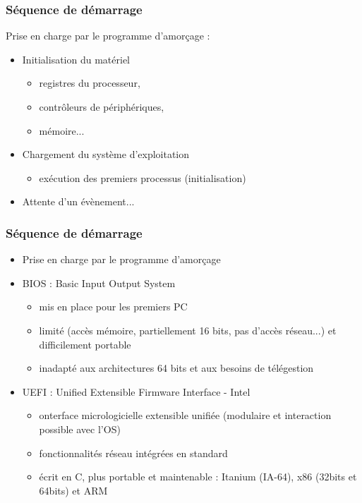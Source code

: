 \begin{frame}
\frametitle{Séquence de démarrage}
Prise en charge par le programme d’amorçage :
\begin{itemize}
\item Initialisation du matériel
\begin{itemize}
\item registres du processeur,
\item contrôleurs de périphériques,
\item mémoire...
\end{itemize}
\item Chargement du système d’exploitation
\begin{itemize}
\item exécution des premiers processus (initialisation)
\end{itemize}
\item Attente d’un évènement...
\end{itemize}
\end{frame}



\begin{frame}
\frametitle{Séquence de démarrage}
\begin{itemize}
\item Prise en charge par le programme d'amorçage
\item BIOS : Basic Input Output System \cite{wp-bios}
\begin{itemize}
\item mis en place pour les premiers PC
\item limité (accès mémoire, partiellement 16 bits, pas d'accès réseau...) et difficilement portable
\item inadapté aux architectures 64 bits et aux besoins de télégestion
\end{itemize}

\item UEFI : Unified Extensible Firmware Interface \cite{wp-uefi} - Intel
\begin{itemize}
\item onterface micrologicielle extensible unifiée (modulaire et interaction possible avec l'OS)
\item fonctionnalités réseau intégrées en standard
\item écrit en C, plus portable et maintenable :  Itanium (IA-64), x86 (32bits et 64bits) et ARM
\end{itemize}
\end{itemize}
\end{frame}



